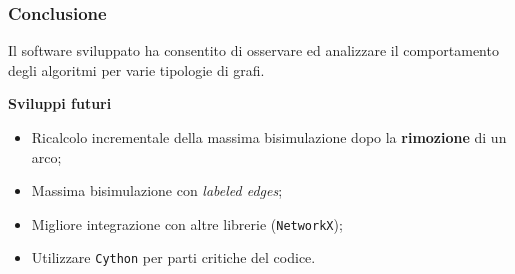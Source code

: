 \documentclass{beamer}
\begin{document}
\begin{frame}\frametitle{Conclusione}
    Il software sviluppato ha consentito di osservare ed analizzare il comportamento degli algoritmi per varie tipologie di grafi.

    \bigskip\bigskip

    \textbf{Sviluppi futuri}
    \begin{itemize}
        \item Ricalcolo incrementale della massima bisimulazione dopo la \textbf{rimozione} di un arco;
        \item Massima bisimulazione con \emph{labeled edges};
        \item Migliore integrazione con altre librerie (\texttt{NetworkX});
        \item Utilizzare \texttt{Cython} per parti critiche del codice.
    \end{itemize}
\end{frame}
\end{document}
